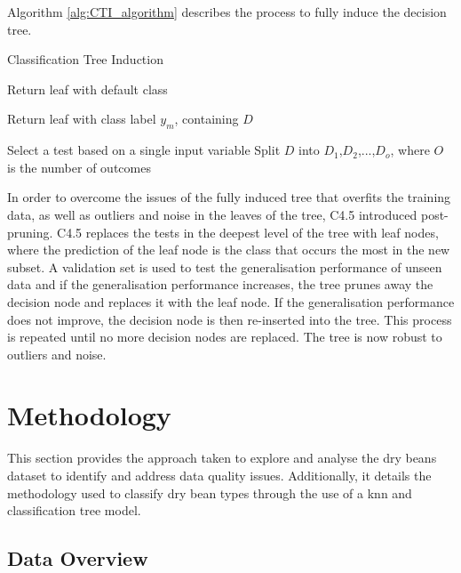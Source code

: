 \documentclass[10pt, conference]{IEEEtran}
\begin{document}
Algorithm \ref{alg:CTI_algorithm} describes the process to fully induce the decision tree. 
\begin{algorithm}
    \caption{Classification Tree Induction}
    \label{alg:CTI_algorithm}
    \begin{algorithmic}[1]
                \State Return leaf with default class
            \EndIf
            
                \State Return leaf with class label $y_m$, containing $D$
            \EndIf{}

            \State Select a test based on a single input variable
            \State Split $D$ into $D_1$,$D_2$,...,$D_o$, where $O$ is the number of outcomes
                \State {}
            \EndFor
        \EndFunction
    \end{algorithmic}
\end{algorithm}

In order to overcome the issues of the fully induced tree that overfits the training data, as well as outliers and
noise in the leaves of the tree, C4.5 introduced post-pruning. C4.5 replaces the tests in the deepest level
of the tree with leaf nodes, where the prediction of the leaf node is the class that occurs the most in the new subset.
A validation set is used to test the generalisation performance of unseen data and if the generalisation performance
increases, the tree prunes away the decision node and replaces it with the leaf node. If the generalisation performance
does not improve, the decision node is then re-inserted into the tree. This process is repeated until no more decision
nodes are replaced. The tree is now robust to outliers and noise.

\section{Methodology}

This section provides the approach taken to explore and analyse the dry beans dataset to identify and address data quality
issues. Additionally, it details the methodology used to classify dry bean types through the use of a \acrshort{knn}
and classification tree model.

\subsection{Data Overview} \label{Data_Overview}
\end{document}
